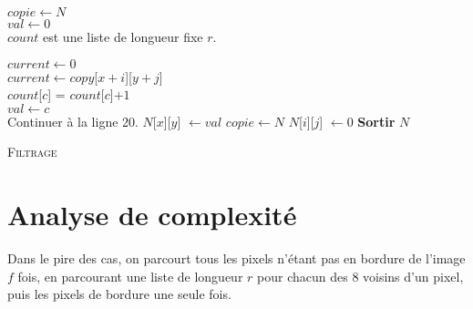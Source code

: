 \documentclass[a4paper, 11pt]{article}
\begin{document}
\begin{algorithm}[H]
\SetSideCommentLeft
    
    $copie \gets N$\\
    $val \gets 0$\\
    $count$ est une liste de longueur fixe $r$.
    
      {
      	  {
      	    {
    			$current \gets 0$\\
   				  {
   				  	  {
   				  	  	  {
   				  	  	    $current \gets copy$[$x + i$][$y + j$]\\
   				  	  	  	  {
   				  	  	  	  		{
   				  	  	  	  			$count$[$c$] = $count$[$c$]$ + 1$\\
   				  	  	  	  			  {
   				  	  	  	  			    $val \gets c$\\
   				  	  	  	  			    Continuer à la ligne 20.
   				  	  	  	  			  }
   				  	  	  	  		}
   				  	  	  	  }
   				  	  	  }
   				  	  }
   				  }
             $N$[$x$][$y$] $\gets val$
      	    }
      	  }
      	  $copie \gets N$
        }
          {
        	{
        	  {
                  {
                    $N$[$i$][$j$] $\gets 0$
                  }
              }
            }
        }
       \textbf{Sortir} $N$
\caption{ \textsc{Filtrage}}
\end{algorithm}

\section*{Analyse de complexité}
Dans le pire des cas, on parcourt tous les pixels n'étant pas en bordure de l'image $f$ fois, en parcourant une liste de longueur $r$ pour chacun des 8 voisins d'un pixel, puis les pixels de bordure une seule fois.
\end{document}
